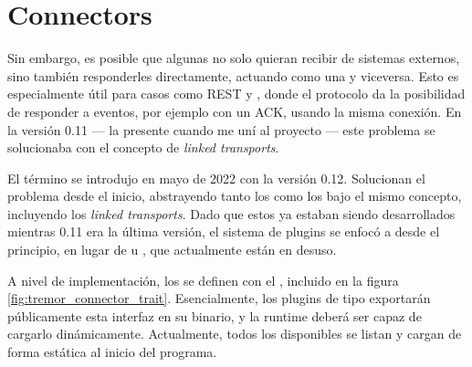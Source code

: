 \section{Connectors}

Sin embargo, es posible que algunas \onramps no solo quieran recibir de sistemas
externos, sino también responderles directamente, actuando como una \offramp y
viceversa. Esto es especialmente útil para casos como REST y \websockets, donde
el protocolo da la posibilidad de responder a eventos, por ejemplo con un ACK,
usando la misma conexión. En la versión 0.11 --- la presente cuando me uní al
proyecto --- este problema se solucionaba con el concepto de \emph{linked
transports}.

El término \connector se introdujo en mayo de 2022 con la versión 0.12.
Solucionan el problema desde el inicio, abstrayendo tanto los \onramps como los
\offramps bajo el mismo concepto, incluyendo los \emph{linked transports}. Dado
que estos ya estaban siendo desarrollados mientras 0.11 era la última versión,
el sistema de plugins se enfocó a \connectors desde el principio, en lugar de
\onramps u \offramps, que actualmente están en desuso.

A nivel de implementación, los \connector se definen con el \trait
{}, incluido en la figura \ref{fig:tremor_connector_trait}.
Esencialmente, los plugins de tipo \connector exportarán públicamente esta
interfaz en su binario, y la runtime deberá ser capaz de cargarlo dinámicamente.
Actualmente, todos los \connectors disponibles se listan y cargan de forma
estática al inicio del programa.

